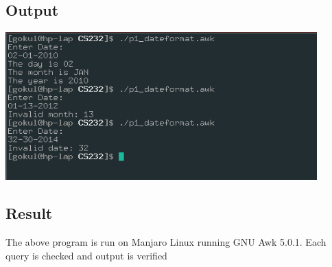 \documentclass{article}
\begin{document}
\subsection{Output}
\includegraphics[width=0.9\textwidth]{img/p20.png}\newline

\subsection{Result}
The above program is run on Manjaro Linux running GNU Awk 5.0.1. 
Each query is checked and output is verified
\end{document}
